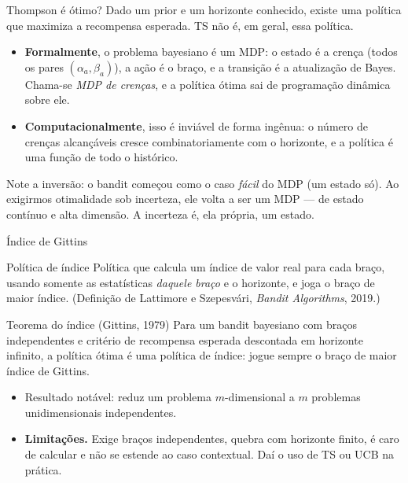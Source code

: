 \documentclass[aspectratio=169, 11pt]{beamer}
\begin{document}
\begin{frame}{Thompson é ótimo?}
  Dado um prior e um horizonte conhecido, existe uma política que maximiza
  a recompensa esperada. TS não é, em geral, essa política.

  \begin{itemize}
    \item \textbf{Formalmente}, o problema bayesiano é um MDP: o estado é a
          \alert{crença} (todos os pares $(\alpha_a,\beta_a)$), a ação é o
          braço, e a transição é a atualização de Bayes. Chama-se
          \emph{MDP de crenças}, e a política ótima sai de programação
          dinâmica sobre ele.
    \item \textbf{Computacionalmente}, isso é inviável de forma ingênua: o
          número de crenças alcançáveis cresce combinatoriamente com o
          horizonte, e a política é uma função de todo o histórico.
  \end{itemize}

  \begin{ideiabox}
    Note a inversão: o bandit começou como o caso \emph{fácil} do MDP
    (um estado só). Ao exigirmos otimalidade sob incerteza, ele volta a ser
    um MDP — de estado contínuo e alta dimensão. \alert{A incerteza é, ela
    própria, um estado.}
  \end{ideiabox}
\end{frame}

\begin{frame}{Índice de Gittins}
  \begin{defbox}{Política de índice}
    Política que calcula um índice de valor real para cada braço, usando
    somente as estatísticas \emph{daquele braço} e o horizonte, e joga o
    braço de maior índice.
    {\scriptsize (Definição de Lattimore e Szepesvári, \emph{Bandit
    Algorithms}, 2019.)}
  \end{defbox}

  \begin{teobox}{Teorema do índice (Gittins, 1979)}
    Para um bandit bayesiano com braços \alert{independentes} e critério de
    recompensa esperada \alert{descontada} em horizonte infinito, a
    política ótima é uma política de índice: jogue sempre o braço de maior
    índice de Gittins.
  \end{teobox}

  \begin{itemize}
    \item Resultado notável: reduz um problema $m$-dimensional a $m$
          problemas unidimensionais independentes.
    \item \textbf{Limitações.} Exige braços independentes, quebra com
          horizonte finito, é caro de calcular e não se estende ao caso
          contextual. Daí o uso de TS ou UCB na prática.
  \end{itemize}
\end{frame}
\end{document}
